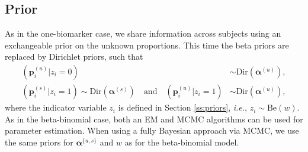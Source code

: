 \documentclass[12pt,oupdraft]{biostatistics}
\begin{document}
\subsection{Prior}
As in the one-biomarker case, we share information across subjects using an exchangeable prior on the unknown proportions. This time the beta priors are replaced by Dirichlet priors, such that
\begin{align*}
(\mathbf{p}^{(u)}_{i}|z_i=0) &\sim \mathrm{Dir}(\boldsymbol{\alpha}^{(u)}),\\\nonumber
 (\mathbf{p}^{(s)}_{i}|z_i=1) \sim \mathrm{Dir}(\boldsymbol{\alpha}^{(s)}) \quad \text{and}\quad (\mathbf{p}^{(u)}_{i}|z_i=1) &\sim \mathrm{Dir}(\boldsymbol{\alpha}^{(u)}),\end{align*}
where the indicator variable $z_i$ is defined in Section \ref{ss:priors}, \textit{i.e.}, $z_i\sim\mathrm{Be}(w)$. As in the beta-binomial case, both an EM and MCMC algorithms can be used for parameter estimation. When using a fully Bayesian approach via MCMC, we use the same priors for $\boldsymbol{\alpha}^{\{u,s\}}$ and $w$ as for the beta-binomial model.
\end{document}
